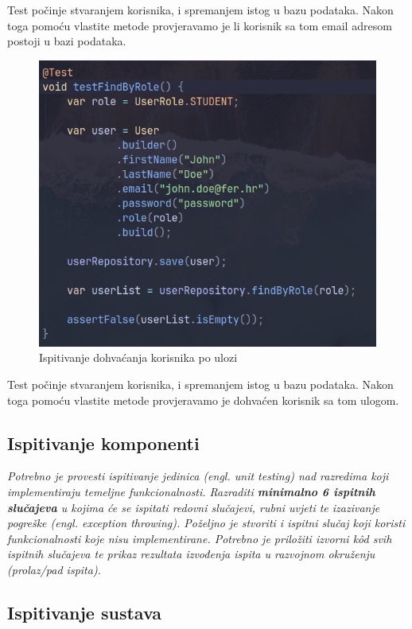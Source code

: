 Test počinje stvaranjem korisnika, i spremanjem istog u bazu podataka. Nakon 
toga pomoću vlastite metode provjeravamo je li korisnik sa tom email adresom 
postoji u bazi podataka.

\begin{figure}[H]
	\includegraphics[scale=0.6]{slike/test_6.png}
	\centering
	\caption{Ispitivanje dohvaćanja korisnika po ulozi}
	\label{fig:test_6}
\end{figure}

Test počinje stvaranjem korisnika, i spremanjem istog u bazu podataka. Nakon 
toga pomoću vlastite metode provjeravamo je dohvaćen korisnik sa tom ulogom.
			
			\subsection{Ispitivanje komponenti}
			\textit{Potrebno je provesti ispitivanje jedinica (engl. unit testing) nad razredima koji implementiraju temeljne funkcionalnosti. Razraditi \textbf{minimalno 6 ispitnih slučajeva} u kojima će se ispitati redovni slučajevi, rubni uvjeti te izazivanje pogreške (engl. exception throwing). Poželjno je stvoriti i ispitni slučaj koji koristi funkcionalnosti koje nisu implementirane. Potrebno je priložiti izvorni kôd svih ispitnih slučajeva te prikaz rezultata izvođenja ispita u razvojnom okruženju (prolaz/pad ispita). }
			
			
			
			\subsection{Ispitivanje sustava}
			
